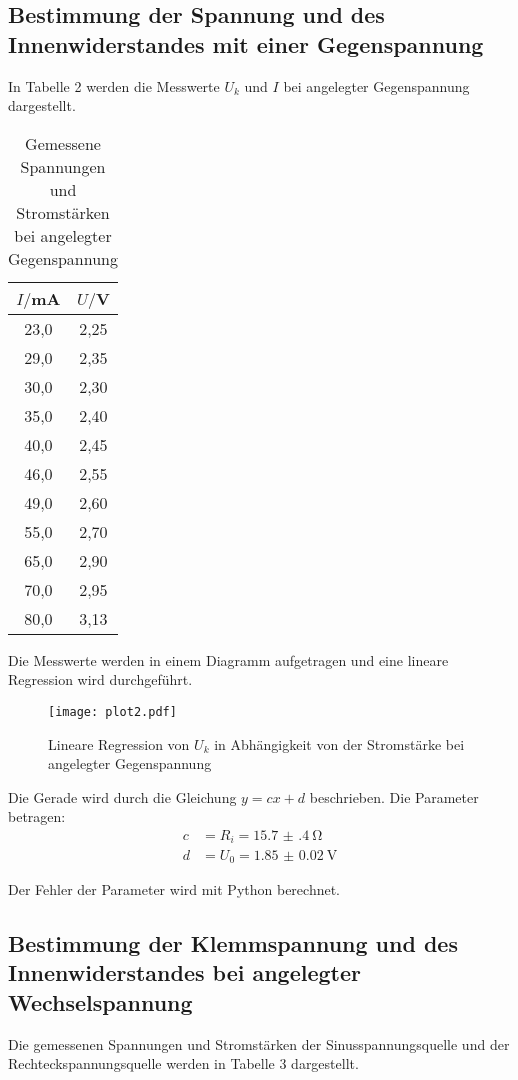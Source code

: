 \subsection{Bestimmung der Spannung und des Innenwiderstandes mit einer Gegenspannung}

In Tabelle 2 werden die Messwerte $U_k$ und $I$ bei angelegter Gegenspannung dargestellt.

\begin{table}[H]
  \centering
  \caption{Gemessene Spannungen und Stromstärken bei angelegter Gegenspannung}
  \label{tab:gegenspannung}
  \begin{tabular}{c c}
    \toprule
    $I/$mA & $U/$V \\
    \midrule
    23,0  &  2,25 \\
    29,0  &  2,35 \\
    30,0  &  2,30 \\
    35,0  &  2,40 \\
    40,0  &  2,45 \\
    46,0  &  2,55 \\
    49,0  &  2,60 \\
    55,0  &  2,70 \\
    65,0  &  2,90 \\
    70,0  &  2,95 \\
    80,0  &  3,13 \\
    \bottomrule
  \end{tabular}
\end{table}

Die Messwerte werden in einem Diagramm aufgetragen und eine lineare Regression wird durchgeführt.

\begin{figure}[H]
  \centering
  \texttt{[image: plot2.pdf]}
  \caption{Lineare Regression von $U_k$ in Abhängigkeit von der Stromstärke bei angelegter Gegenspannung }
  \label{fig:plot2}
\end{figure}

Die Gerade wird durch die Gleichung $y = cx + d$ beschrieben. Die Parameter betragen:
\begin{align*}
  c &= R_i = \SI{15.7(4)}{\ohm} \\
  d &= U_0 = \SI{1.85(2)}{\volt}
\end{align*}

Der Fehler der Parameter wird mit Python berechnet.


\subsection{Bestimmung der Klemmspannung und des Innenwiderstandes bei angelegter Wechselspannung}
Die gemessenen Spannungen und Stromstärken der Sinusspannungsquelle und der Rechteckspannungsquelle werden
in Tabelle 3 dargestellt.

